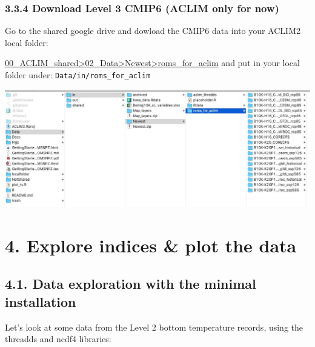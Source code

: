 \documentclass[
]{article}
\begin{document}
\hypertarget{download-level-3-cmip6-aclim-only-for-now}{%
\subsubsection{3.3.4 Download Level 3 CMIP6 (ACLIM only for
now)}\label{download-level-3-cmip6-aclim-only-for-now}}

Go to the shared google drive and dowload the CMIP6 data into your
ACLIM2 local folder:

\href{https://drive.google.com/drive/folders/1ljACM6cgMD7M14lzvozZyTP4tMBnf_S4}{00\_ACLIM\_shared\textgreater02\_Data\textgreater Newest\textgreater roms\_for\_aclim}
and put in your local folder under: \texttt{Data/in/roms\_for\_aclim}

\includegraphics{Figs/filestructure2.jpg}

\hypertarget{explore-indices-plot-the-data}{%
\section{4. Explore indices \& plot the
data}\label{explore-indices-plot-the-data}}

\hypertarget{data-exploration-with-the-minimal-installation}{%
\subsection{4.1. Data exploration with the minimal
installation}\label{data-exploration-with-the-minimal-installation}}

Let's look at some data from the Level 2 bottom temperature records,
using the threadds and ncdf4 libraries:
\end{document}
